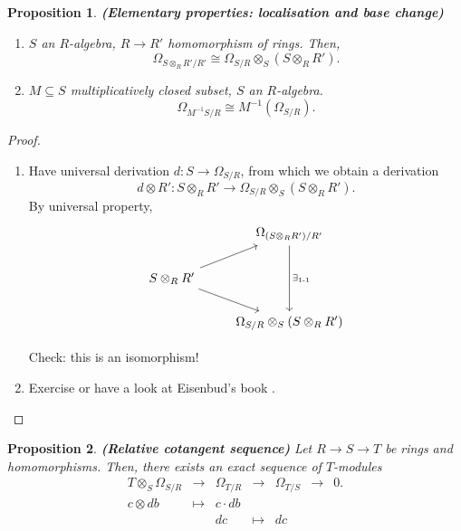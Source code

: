 \documentclass[12pt]{article}
\newtheorem*{proposition}{Proposition}
\theoremstyle{definition}
\begin{document}
\begin{proposition}
\emph{\textbf{(Elementary properties: localisation and base change)}}
\begin{enumerate}[label=\arabic*)]
\item $S$ an $R$-algebra, $R\rightarrow R'$ homomorphism of rings. Then,
\[\Omega_{S\otimes_RR'/R'}\cong\Omega_{S/R}\otimes_S(S\otimes_RR').\]

\item $M\subseteq S$ multiplicatively closed subset, $S$ an $R$-algebra.
\[\Omega_{M^{-1}S/R}\cong M^{-1}(\Omega_{S/R}).\]
\end{enumerate}
\end{proposition}

\begin{proof}
\begin{enumerate}[label=\arabic*)]
\item Have universal derivation $d:S\rightarrow\Omega_{S/R}$, from which we obtain a derivation
\[d\otimes R':S\otimes_RR'\longrightarrow\Omega_{S/R}\otimes_S(S\otimes_RR').\]
By universal property,
\[\begin{tikzcd}&\Omega_{(S\otimes_RR')/R'}\arrow[dd,"\exists_{1\text-1}"]\\S\otimes_RR'\arrow[ru]\arrow[rd]\\&\Omega_{S/R}\otimes_S(S\otimes_RR')\end{tikzcd}\]

Check: this is an isomorphism!

\item Exercise or have a look at Eisenbud's book \cite{eisenbud2013commutative}.
\end{enumerate}
\end{proof}

\begin{proposition}
\emph{\textbf{(Relative cotangent sequence)}} Let $R\rightarrow S\rightarrow T$ be rings and homomorphisms. Then, there exists an exact sequence of $T$-modules
\[\begin{array}{rccclcc}T\otimes_S\Omega_{S/R}&\longrightarrow&\Omega_{T/R}&\longrightarrow&\Omega_{T/S}&\longrightarrow&0.\\c\otimes db&\longmapsto&c\cdot db\\&&dc&\longmapsto&dc\end{array}\]
\end{proposition}
\end{document}
